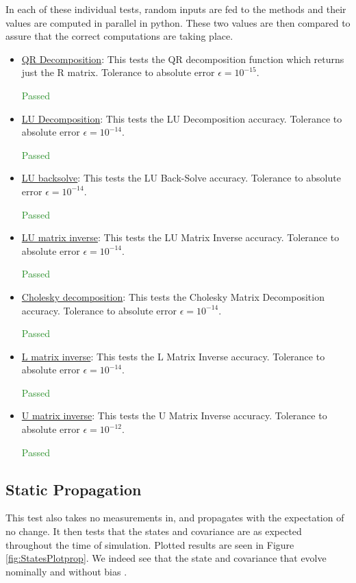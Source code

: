 \documentclass[]{BasiliskReportMemo}
\begin{document}
In each of these individual tests, random inputs are fed to the methods and their values are computed in parallel in python. These two values are then compared to assure that the correct computations are taking place. 
\begin{itemize}
\item \underline{QR Decomposition}: This tests the QR decomposition function which returns just the R matrix. Tolerance to absolute error $\epsilon = 10^{-15}$.

\textcolor{ForestGreen}{Passed}
\item \underline{LU Decomposition}: This tests the LU Decomposition accuracy. Tolerance to absolute error $\epsilon = 10^{-14}$.

\textcolor{ForestGreen}{Passed}
\item \underline{LU backsolve}: This tests the LU Back-Solve accuracy. Tolerance to absolute error $\epsilon = 10^{-14}$.

\textcolor{ForestGreen}{Passed}
\item \underline{LU matrix inverse}: This tests the LU Matrix Inverse accuracy. Tolerance to absolute error $\epsilon = 10^{-14}$.

\textcolor{ForestGreen}{Passed}
\item \underline{Cholesky decomposition}: This tests the Cholesky Matrix Decomposition accuracy. Tolerance to absolute error $\epsilon = 10^{-14}$.

\textcolor{ForestGreen}{Passed}
\item \underline{L matrix inverse}: This tests the L Matrix Inverse accuracy. Tolerance to absolute error $\epsilon = 10^{-14}$.

\textcolor{ForestGreen}{Passed}

\item \underline{U matrix inverse}: This tests the U Matrix Inverse accuracy. Tolerance to absolute error $\epsilon = 10^{-12}$.

\textcolor{ForestGreen}{Passed}
\end{itemize}

\subsection{Static Propagation}




This test also takes no measurements in, and propagates with the expectation of no change. It then tests that the states and covariance are as expected throughout the time of simulation. Plotted results are seen in Figure \ref{fig:StatesPlotprop}. We indeed see that the state and covariance that evolve nominally and without bias .
\end{document}
